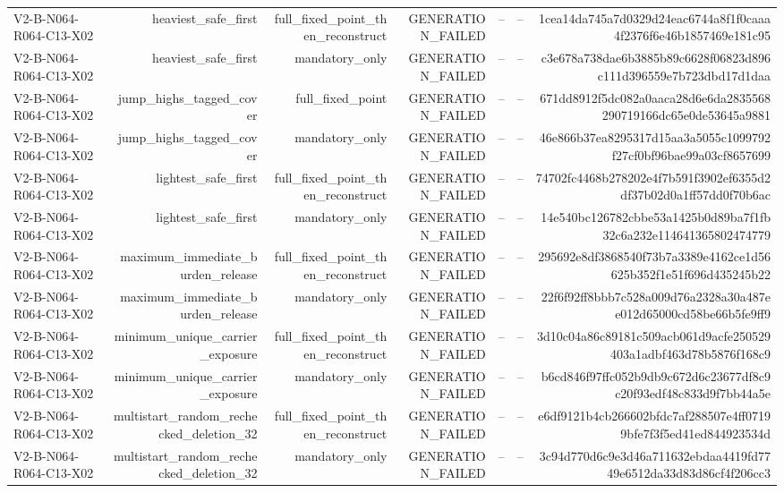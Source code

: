 {\begin{longtable}{lrrrrrr}
V2-B-N064-R064-C13-X02 & heaviest\_safe\_first & full\_fixed\_point\_then\_reconstruct & GENERATION\_FAILED & -- & -- & 1cea14da745a7d0329d24eac6744a8f1f0caaa4f2376f6e46b1857469e181c95 \\
V2-B-N064-R064-C13-X02 & heaviest\_safe\_first & mandatory\_only & GENERATION\_FAILED & -- & -- & c3e678a738dae6b3885b89c6628f06823d896c111d396559e7b723dbd17d1daa \\
V2-B-N064-R064-C13-X02 & jump\_highs\_tagged\_cover & full\_fixed\_point & GENERATION\_FAILED & -- & -- & 671dd8912f5dc082a0aaca28d6e6da2835568290719166dc65e0de53645a9881 \\
V2-B-N064-R064-C13-X02 & jump\_highs\_tagged\_cover & mandatory\_only & GENERATION\_FAILED & -- & -- & 46e866b37ea8295317d15aa3a5055c1099792f27cf0bf96bae99a03cf8657699 \\
V2-B-N064-R064-C13-X02 & lightest\_safe\_first & full\_fixed\_point\_then\_reconstruct & GENERATION\_FAILED & -- & -- & 74702fc4468b278202e4f7b591f3902ef6355d2df37b02d0a1ff57dd0f70b6ac \\
V2-B-N064-R064-C13-X02 & lightest\_safe\_first & mandatory\_only & GENERATION\_FAILED & -- & -- & 14e540bc126782cbbe53a1425b0d89ba7f1fb32c6a232e114641365802474779 \\
V2-B-N064-R064-C13-X02 & maximum\_immediate\_burden\_release & full\_fixed\_point\_then\_reconstruct & GENERATION\_FAILED & -- & -- & 295692e8df3868540f73b7a3389e4162ce1d56625b352f1e51f696d435245b22 \\
V2-B-N064-R064-C13-X02 & maximum\_immediate\_burden\_release & mandatory\_only & GENERATION\_FAILED & -- & -- & 22f6f92ff8bbb7c528a009d76a2328a30a487ee012d65000cd58be66b5fe9ff9 \\
V2-B-N064-R064-C13-X02 & minimum\_unique\_carrier\_exposure & full\_fixed\_point\_then\_reconstruct & GENERATION\_FAILED & -- & -- & 3d10c04a86c89181c509acb061d9acfe250529403a1adbf463d78b5876f168c9 \\
V2-B-N064-R064-C13-X02 & minimum\_unique\_carrier\_exposure & mandatory\_only & GENERATION\_FAILED & -- & -- & b6cd846f97ffc052b9db9c672d6c23677df8c9c20f93edf48c833d9f7bb44a5e \\
V2-B-N064-R064-C13-X02 & multistart\_random\_rechecked\_deletion\_32 & full\_fixed\_point\_then\_reconstruct & GENERATION\_FAILED & -- & -- & e6df9121b4cb266602bfdc7af288507e4ff07199bfe7f3f5ed41ed844923534d \\
V2-B-N064-R064-C13-X02 & multistart\_random\_rechecked\_deletion\_32 & mandatory\_only & GENERATION\_FAILED & -- & -- & 3c94d770d6c9e3d46a711632ebdaa4419fd7749e6512da33d83d86cf4f206cc3 \\

\end{longtable}}
